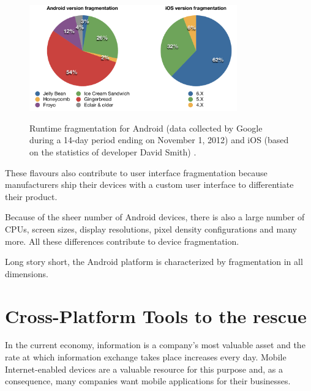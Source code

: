 \begin{figure}[h!]
    \begin{center}
        \label{fig:runtime_fragmentation}
        \includegraphics[width=0.8\textwidth]{figs/os_distribution.pdf}
        \caption{
            Runtime fragmentation for Android (data collected by Google during a 14-day period ending on November 1, 2012) \citep{android_distribution} and iOS (based on the statistics of developer David Smith) \citep{ios_distribution}.
        }
    \end{center}
\end{figure}

These flavours also contribute to user interface fragmentation because manufacturers ship their devices with a custom user interface to differentiate their product.

Because of the sheer number of Android devices, there is also a large  number of CPUs, screen sizes, display resolutions, pixel density configurations and many more. All these differences contribute to device fragmentation. 

Long story short, the Android platform is characterized by fragmentation in all dimensions.

\section{Cross-Platform Tools to the rescue}

In the current economy, information is a company's most valuable asset and the rate at which information exchange takes place increases every day. Mobile Internet-enabled devices are a valuable resource for this purpose and, as a consequence, many companies want mobile applications for their businesses.

